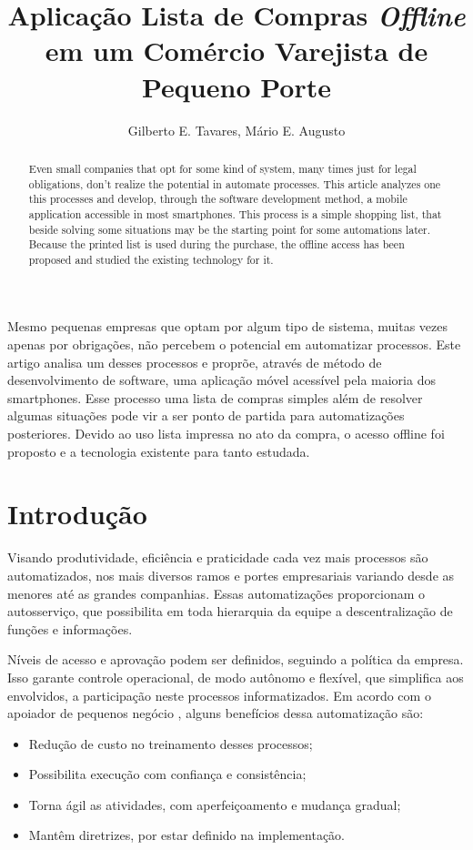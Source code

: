 \documentclass[12pt]{article}
\title{Aplicação Lista de Compras \textit{Offline}\\em um Comércio Varejista de Pequeno Porte}
\author{Gilberto E. Tavares\inst{1}, Mário E. Augusto\inst{1}}
\begin{document}
\maketitle

\begin{abstract}
Even small companies that opt for some kind of system, many times just for legal obligations, don't realize the potential in automate processes. This article analyzes one this processes and develop, through the software development method, a mobile application accessible in most smartphones. This process is a simple shopping list, that beside solving some situations may be the starting point for some automations later. Because the printed list is used during the purchase, the offline access has been proposed and studied the existing technology for it.
\end{abstract}

\begin{resumo}
Mesmo pequenas empresas que optam por algum tipo de sistema, muitas vezes apenas por obrigações, não percebem o potencial em automatizar processos. Este artigo analisa um desses processos e proprõe, através de método de desenvolvimento de software, uma aplicação móvel acessível pela maioria dos smartphones. Esse processo uma lista de compras simples além de resolver algumas situações pode vir a ser ponto de partida para automatizações posteriores. Devido ao uso lista impressa no ato da compra, o acesso offline foi proposto e a tecnologia existente para tanto estudada.
\end{resumo}


\section{Introdução}

Visando produtividade, eficiência e praticidade cada vez mais processos são automatizados, nos mais diversos ramos e portes empresariais variando desde as menores até as grandes companhias. Essas automatizações proporcionam o autosserviço, que possibilita em toda hierarquia da equipe a descentralização de funções e informações.

Níveis de acesso e aprovação podem ser definidos, seguindo a política da empresa. Isso garante controle operacional, de modo autônomo e flexível, que simplifica aos envolvidos, a participação neste processos informatizados. Em acordo com o apoiador de pequenos negócio \cite{sebrae2015}, alguns benefícios dessa automatização são:
\begin{itemize}
\item Redução de custo no treinamento desses processos;
\item Possibilita execução com confiança e consistência;
\item Torna ágil as atividades, com aperfeiçoamento e mudança gradual;
\item Mantêm diretrizes, por estar definido na implementação.
\end{itemize}
\end{document}

